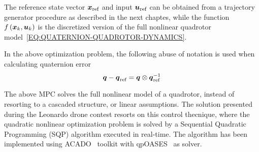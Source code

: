 The reference state vector $\boldsymbol{x}_{\text{ref}}$ and input $\boldsymbol{u}_{\text{ref}}$ can be obtained from a trajectory generator procedure as described in the next chaptes,
while the function $f \left( \boldsymbol{x}_k, \boldsymbol{u}_k \right)$ is the discretized version of the full nonlinear quadrotor model~\eqref{EQ:QUATERNION-QUADROTOR-DYNAMICS}.
\begin{remark}
    In the above optimization problem, the following abuse of notation is used when calculating quaternion error
    \begin{equation*}
        \boldsymbol{q} - \boldsymbol{q}_{\text{ref}} = \boldsymbol{q} \otimes \boldsymbol{q}_{\text{ref}}^{-1}
    \end{equation*}
\end{remark}
The above MPC solves the full nonlinear model of a quadrotor, instead of resorting to a cascaded structure, or linear assumptions.
The solution presented during the Leonardo drone contest resorts on this control thecnique, where the quadratic nonlinear optimization problem is solved
by a Sequential Quadratic Programming (SQP) algorithm executed in real-time.
The algorithm has been implemented using ACADO~\cite{verschueren2018towards} toolkit with qpOASES~\cite{ferreau2014qpoases} as solver.



